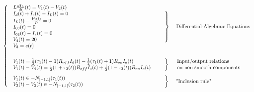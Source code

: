 \documentclass{article}
\begin{document}
\begin{equation}
  \label{eq:72}
 \left\{ \begin{array}{l l l}
    \begin{array}{l}
      L  \frac{dI_L}{dt}(t) = V_1(t)-V_2(t) \\
      I_d(t)+I_s(t)-I_L(t)=0 \\
      I_L(t)-\frac{V_2(t)}{R}=0\\
      I_{03}(t)=0\\
      I_{04}(t)-I_{s}(t)=0\\
      V_4(t)=20\\
      V_3=e(t)\\
\end{array}
& \left.\begin{array}{l}
      \\
      \\ \\ \\ \\
\end{array}\right\}& \text{ Differential-Algebraic Equations}\\ \\[2mm]
  \begin{array}{l}
V_{1}(t)=\frac{1}{2}(\tau_{1}(t)-1)R_{off} I_{d}(t)-\frac{1}{2}(\tau_{1}(t)+1) R_{on} I_{d}(t) \\ 
V_{1}(t)-V_{4}(t)=\frac{1}{2}(1+\tau_{2}(t)) R_{off} I_{s}(t)+\frac{1}{2}(1-\tau_{2}(t)) R_{on} I_{s}(t)
  \end{array} & \left.\begin{array}{c}
     \\ \\
  \end{array}\right\} & \begin{array}{l}
   \text{Input/output relations }\\
   \text{on non-smooth components}
  \end{array}  \\  [5mm]
  \begin{array}{l}
  V_{1}(t) \in - N_{[-1,1]}(\tau_{1}(t)) \\   V_{3}(t)-V_{2}(t) \in -N_{[-1,1]}(\tau_{2}(t))
\end{array} 
& \left.\begin{array}{c} \\ \\ \end{array}\right\}  &  \text{ "Inclusion rule"}\\ 
\end{array}\right.
\end{equation}
\end{document}
